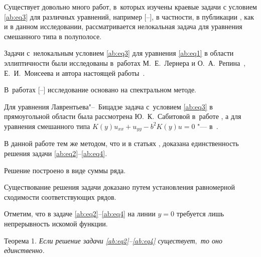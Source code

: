 Существует довольно много работ, в~которых изучены краевые задачи с условием \eqref{ab:eq3} для различных уравнений, например [--], в частности, в публикации \cite{ab:bib:Sidorenko}, как и в данном исследовании, рассматривается нелокальная задача для уравнения смешанного типа в полуполосе. 

Задачи с~нелокальным условием \eqref{ab:eq3} для уравнения \eqref{ab:eq1} в области эллиптичности были исследованы в~работах М.~Е.~Лернера и О.~А.~Репина~\cite{ab:bib:LernerRepin1},  Е.~И.~Моисеева \cite{ab:bib:Moiseev1} и автора настоящей работы~\cite{ab:bib:Abashkin1,  ab:bib:Abashkin2}. 

В~работах [--] исследование основано на спектральном методе.



Для уравнения Лаврентьева"--~Бицадзе задача с~условием \eqref{ab:eq3} в прямоугольной области была рассмотрена Ю.~К.~Сабитовой в~работе \cite{ab:bib:Sabitova1}, а для уравнения смешанного типа $K(y)u_{xx}+u_{yy}-b^2K(y)u=0$  "--- в~\cite{ab:bib:Sabitova2}. 



В данной работе тем же методом, что и в статьях \cite{ab:bib:Moiseev2, ab:bib:Moiseev1, ab:bib:Sabitova1}, доказана единственность решения задачи \eqref{ab:eq2}--\eqref{ab:eq4}. 

Решение построено в виде суммы ряда. 

Существование решения задачи доказано путем установления равномерной сходимости соответствующих рядов.



Отметим, что в задаче \eqref{ab:eq2}--\eqref{ab:eq4} на линии  $y=0$ требуется лишь непрерывность искомой функции.



\smallskip






\hypertarget{ab:th1}{}



{\small \sc Теорема 1.} \it Если решение задачи \eqref{ab:eq2}--\eqref{ab:eq4} существует$,$ то оно единственно\rm. 



\smallskip



